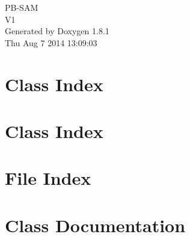 \documentclass{book}
\begin{document}
\hypersetup{pageanchor=false,citecolor=blue}
\begin{titlepage}
\vspace*{7cm}
\begin{center}
{\Large P\-B-\/\-S\-A\-M \\[1ex]\large V1 }\\
\vspace*{1cm}
{\large Generated by Doxygen 1.8.1}\\
\vspace*{0.5cm}
{\small Thu Aug 7 2014 13:09:03}\\
\end{center}
\end{titlepage}
\clearemptydoublepage
{}
\tableofcontents
\clearemptydoublepage
{}
\hypersetup{pageanchor=true,citecolor=blue}
\chapter{Class Index}

\chapter{Class Index}

\chapter{File Index}

\chapter{Class Documentation}












































\end{document}
